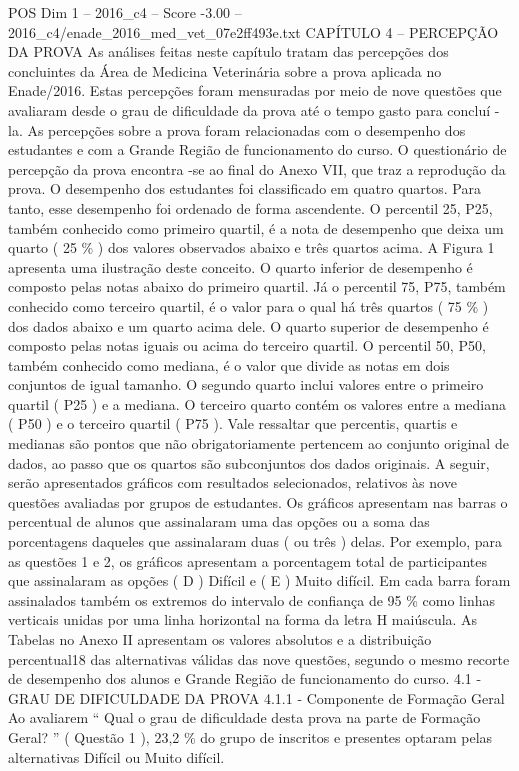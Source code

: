 \begin{textsample}{POS Dim 1 – 2016\_c4 – Score -3.00 – 2016\_c4/enade\_2016\_med\_vet\_07e2ff493e.txt}  \label{ex:f1_pos_284}
CAPÍTULO 4 – PERCEPÇÃO DA PROVA As análises feitas neste capítulo tratam das percepções dos concluintes da Área de Medicina Veterinária sobre a prova aplicada no Enade/2016.
Estas percepções foram mensuradas por meio de nove questões que avaliaram desde o grau de dificuldade da prova até o tempo gasto para concluí -la.
As percepções sobre a prova foram relacionadas com o desempenho dos estudantes e com a Grande Região de funcionamento do curso.
O questionário de percepção da prova encontra -se ao final do Anexo VII, que traz a reprodução da prova.
O desempenho dos estudantes foi classificado em quatro quartos.
Para tanto, esse desempenho foi ordenado de forma ascendente.
O percentil 25, P25, também conhecido como primeiro quartil, é a nota de desempenho que deixa um quarto ( 25 \% ) dos valores observados abaixo e três quartos acima.
A Figura 1 apresenta uma ilustração deste conceito.
O quarto inferior de desempenho é composto pelas notas abaixo do primeiro quartil.
Já o percentil 75, P75, também conhecido como terceiro quartil, é o valor para o qual há três quartos ( 75 \% ) dos dados abaixo e um quarto acima dele.
O quarto superior de desempenho é composto pelas notas iguais ou acima do terceiro quartil.
O percentil 50, P50, também conhecido como mediana, é o valor que divide as notas em dois conjuntos de igual tamanho.
O segundo quarto inclui valores entre o primeiro quartil ( P25 ) e a mediana.
O terceiro quarto contém os valores entre a mediana ( P50 ) e o terceiro quartil ( P75 ).
Vale ressaltar que percentis, quartis e medianas são pontos que não obrigatoriamente pertencem ao conjunto original de dados, ao passo que os quartos são subconjuntos dos dados originais.
A seguir, serão apresentados gráficos com resultados selecionados, relativos às nove questões avaliadas por grupos de estudantes.
Os gráficos apresentam nas barras o percentual de alunos que assinalaram uma das opções ou a soma das porcentagens daqueles que assinalaram duas ( ou três ) delas.
Por exemplo, para as questões 1 e 2, os gráficos apresentam a porcentagem total de participantes que assinalaram as opções ( D ) Difícil e ( E ) Muito difícil.
Em cada barra foram assinalados também os extremos do intervalo de confiança de 95 \% como linhas verticais unidas por uma linha horizontal na forma da letra H maiúscula.
As Tabelas no Anexo II apresentam os valores absolutos e a distribuição percentual18 das alternativas válidas das nove questões, segundo o mesmo recorte de desempenho dos alunos e Grande Região de funcionamento do curso. 4.1 - GRAU DE DIFICULDADE DA PROVA 4.1.1 - Componente de Formação Geral Ao avaliarem “ Qual o grau de dificuldade desta prova na parte de Formação Geral? ” ( Questão 1 ), 23,2 \% do grupo de inscritos e presentes optaram pelas alternativas Difícil ou Muito difícil.

\end{textsample}

